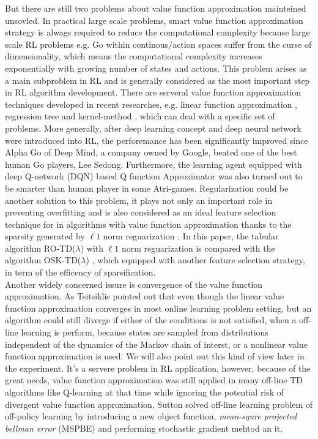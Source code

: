 \documentclass[conference]{IEEEtran}
\begin{document}
But there are still two problems about value function approximation mainteined unsovled. In practical large scale problems, smart value function approximation strategy is alwags required to reduce the computational complexity because large scale RL problems e.g. Go within continous/action spaces suffer from the curse of dimensionality, which means the computational complexity increases exponentially with growing number of states and actions. This problem arises as a main subproblem in RL and is generally considered as the most important step in RL algorithm development. There are serveral value function approximation techniques developed in recent researches, e.g. linear function approximation \cite{sutton1998reinforcement} \cite{tsitsiklis1997analysis}, regression tree \cite{ernst2005tree} and kernel-method \cite{xu2007kernel}\cite{ormoneit2002kernel}, which can deal with a specific set of problems. More generally, after deep learning \cite{lecun2015deep} concept and deep neural network were introduced into RL, the perforemance has been significantly improved since Alpha Go of Deep Mind, a company owned by Google, beated one of the best human Go players, Lee Sedong. Furthermore, the learning agent equipped with deep Q-network (DQN) \cite{mnih2015human} based Q function Approximator was also turned out to be smarter than human player in some Atri-games. Regularization could be another solution to this problem, it plays not only an important role in preventing overfitting and is also considered as an ideal feature selection technique for in algorithms with value function approximation thanks to the sparsity generated by $\ell1$ norm reguarization\cite{kolter2009regularization} \cite{liu2012regularized}. In this paper, the tabular algorithm RO-TD($\lambda$) with $\ell1$ norm reguarization is compared with the algorithm OSK-TD($\lambda$) \cite{chen2013online}, which equipped with another feature selection strategy, in term of the efficency of sparsification.\\

Another widely concerned issure is convergence of the value function approximation. As Tsitsiklis \cite{tsitsiklis1997analysis} pointed out that even though the linear value function approximation converges in most online learning problem setting, but an algorithm could still diverge if either of the conditions is not satisfied, when a off-line learning is perform, because states are sampled from distributions independent of the dynamics of the Markov chain of interst, or a nonlinear value function approximation is used. We will also point out this kind of view later in the experiment. It's a servere problem in RL application, however, because of the great needs, value function approximation was still applied in many off-line TD algorithms like Q-learning at that time while ignoring the potential risk of divergent value function approximation. Sutton \cite{sutton1998reinforcement}\cite{sutton2009fast} solved off-line learning problem of off-policy learning by introducing a new object function, \textit{mean-squre projected bellman error} (\textup{MSPBE}) and performing stochastic gradient mehtod an it.\\
\end{document}
